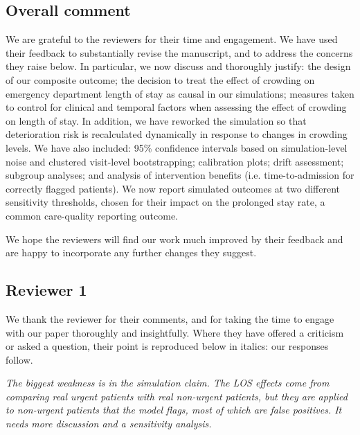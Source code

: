 
\subsection{Overall comment}

We are grateful to the reviewers for their time and engagement. We have used their feedback to substantially revise the manuscript, and to address the concerns they raise below. In particular, we now discuss and thoroughly justify: the design of our composite outcome; the decision to treat the effect of crowding on emergency department length of stay as causal in our simulations; measures taken to control for clinical and temporal factors when assessing the effect of crowding on length of stay. In addition, we have reworked the simulation so that deterioration risk is recalculated dynamically in response to changes in crowding levels. We have also included: 95\% confidence intervals based on simulation-level noise and clustered visit-level bootstrapping; calibration plots; drift assessment; subgroup analyses; and analysis of intervention benefits (i.e. time-to-admission for correctly flagged patients). We now report simulated outcomes at two different sensitivity thresholds, chosen for their impact on the prolonged stay rate, a common care-quality reporting outcome. 

We hope the reviewers will find our work much improved by their feedback and are happy to incorporate any further changes they suggest.

\subsection{Reviewer 1}

We thank the reviewer for their comments, and for taking the time to engage with our paper thoroughly and insightfully. Where they have offered a criticism or asked a question, their point is reproduced below in italics: our responses follow.


     \textit{The biggest weakness is in the simulation claim. The LOS effects come from comparing real urgent patients with real non-urgent patients, but they are applied to non-urgent patients that the model flags, most of which are false positives. It needs more discussion and a sensitivity analysis.}

